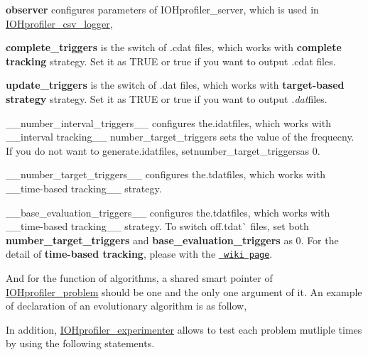 {\bfseries{observer}} configures parameters of {\ttfamily I\+O\+Hprofiler\+\_\+server}, which is used in {\ttfamily \mbox{\hyperlink{class_i_o_hprofiler__csv__logger}{I\+O\+Hprofiler\+\_\+csv\+\_\+logger}}},
\begin{DoxyItemize}
\item {\bfseries{complete\+\_\+triggers}} is the switch of {\ttfamily .cdat} files, which works with {\bfseries{complete tracking}} strategy. Set it as {\ttfamily T\+R\+UE} or {\ttfamily true} if you want to output {\ttfamily .cdat} files.
\item {\bfseries{update\+\_\+triggers}} is the switch of {\ttfamily .dat} files, which works with {\bfseries{target-\/based strategy}} strategy. Set it as {\ttfamily T\+R\+UE} or {\ttfamily true} if you want to output {\itshape .dat}{\ttfamily files.}
\item {\ttfamily \+\_\+\+\_\+number\+\_\+interval\+\_\+triggers\+\_\+\+\_\+ configures the}.idat{\ttfamily files, which works with \+\_\+\+\_\+interval tracking\+\_\+\+\_\+ number\+\_\+target\+\_\+triggers sets the value of the frequecny. If you do not want to generate}.idat{\ttfamily files, set}number\+\_\+target\+\_\+triggers{\ttfamily as 0.}
\item {\ttfamily \+\_\+\+\_\+number\+\_\+target\+\_\+triggers\+\_\+\+\_\+ configures the}.tdat{\ttfamily files, which works with \+\_\+\+\_\+time-\/based tracking\+\_\+\+\_\+ strategy.}
\item {\ttfamily \+\_\+\+\_\+base\+\_\+evaluation\+\_\+triggers\+\_\+\+\_\+ configures the}.tdat{\ttfamily files, which works with \+\_\+\+\_\+time-\/based tracking\+\_\+\+\_\+ strategy. To switch off}.tdat\`{} files, set both {\bfseries{number\+\_\+target\+\_\+triggers}} and {\bfseries{base\+\_\+evaluation\+\_\+triggers}} as 0. For the detail of {\bfseries{time-\/based tracking}}, please with the \href{https://iohprofiler.github.io/IOHexperimenter/Loggers/Observer/}{\texttt{ wiki page}}.
\end{DoxyItemize}

And for the function of algorithms, a shared smart pointer of {\ttfamily \mbox{\hyperlink{class_i_o_hprofiler__problem}{I\+O\+Hprofiler\+\_\+problem}}} should be one and the only one argument of it. An example of declaration of an evolutionary algorithm is as follow, 
\begin{DoxyCode}{0}
\end{DoxyCode}


In addition, {\ttfamily \mbox{\hyperlink{class_i_o_hprofiler__experimenter}{I\+O\+Hprofiler\+\_\+experimenter}}} allows to test each problem mutliple times by using the following statements. 
\begin{DoxyCode}{0}
\end{DoxyCode}
 